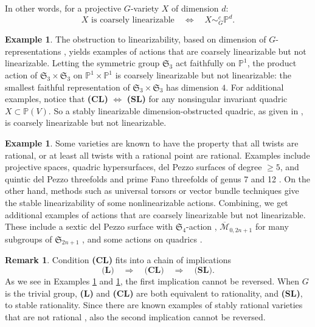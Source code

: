 \documentclass[12pt, reqno]{amsart}
\numberwithin{equation}{section}
\theoremstyle{plain}
\theoremstyle{definition}
\newtheorem{exam}[prop]{Example}
\newtheorem{rema}[prop]{Remark}
\def\bP{{\mathbb P}}
\begin{document}
In other words, for a projective $G$-variety $X$ of dimension $d$:
\[ \text{$X$ is coarsely linearizable}\quad\Leftrightarrow\quad X\sim_G^c \bP^d. \]

\begin{exam}
\label{exa.dimension}
The obstruction to linearizability, based on dimension of $G$-representations \cite[\S 4.1]{KTsurvey}, yields examples of actions that are coarsely linearizable but not linearizable.
Letting the symmetric group $\mathfrak{S}_3$ act faithfully on $\bP^1$, the product action of $\mathfrak{S}_3\times \mathfrak{S}_3$ on $\bP^1\times \bP^1$ is coarsely linearizable but not linearizable: the smallest faithful representation of $\mathfrak{S}_3\times \mathfrak{S}_3$ has dimension $4$.
For additional examples, notice that
\textbf{(CL)} $\Leftrightarrow$ \textbf{(SL)}
for any nonsingular invariant quadric $X\subset \bP(V)$.
So a stably linearizable dimension-obstructed quadric, as given in \cite[\S 4.1]{KTsurvey}, is coarsely linearizable but not linearizable.
\end{exam}

\begin{exam}
\label{exa.alltwistsrational}
Some varieties are known to have the property that all twists are rational, or at least all twists with a rational point are rational.
Examples include projective spaces, quadric hypersurfaces, 
del Pezzo surfaces of degree $\ge 5$, 
and quintic del Pezzo threefolds and prime Fano threefolds of genus 7 and 12 \cite[Thm.\ 1.1]{Kuznetsov-Prokhorov}.
On the other hand, methods such as universal torsors
or vector bundle techniques
give the stable linearizability of some nonlinearizable actions.
Combining, we get additional examples of actions that are coarsely linearizable but not linearizable.
These include a sextic del Pezzo surface with $\mathfrak{S}_4$-action \cite[Sect.\ 5.2]{HT23},
$\overline{\mathcal{M}}_{0,2n+1}$ for many subgroups of $\mathfrak{S}_{2n+1}$ \cite{HTZ},  and
some actions on quadrics \cite[Prop.\ 12]{BBT}.
\end{exam}

\begin{rema}
\label{rem.LCLSL}
Condition \textbf{(CL)} fits into a chain of implications
\[ \textbf{(L)}\quad\Rightarrow\quad \textbf{(CL)}\quad\Rightarrow\quad \textbf{(SL)}. \]
As we see in Examples \ref{exa.dimension} and \ref{exa.alltwistsrational}, the
first implication cannot be reversed.
When $G$ is the trivial group, \textbf{(L)} and \textbf{(CL)} are both equivalent to rationality, and \textbf{(SL)}, to stable rationality.
Since there are
known examples of stably rational varieties that are not rational \cite{BCTSSD}, also the second implication cannot be reversed.
\end{rema}
\end{document}
